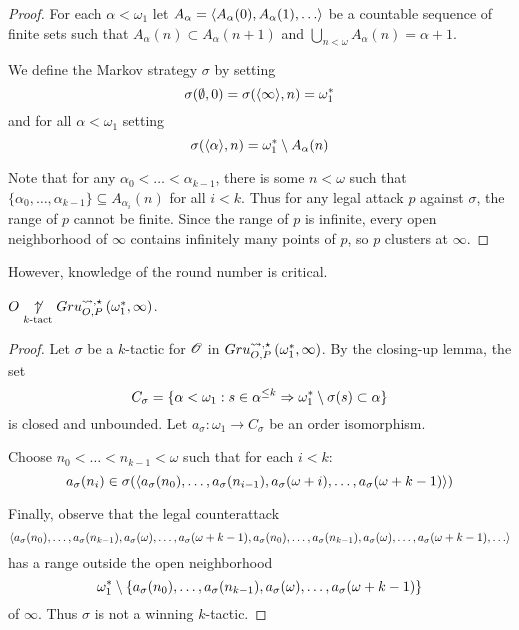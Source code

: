\begin{proof}
  For each $\alpha<\omega_1$ let $A_\alpha=\<A_\alpha(0),A_\alpha(1),\dots\>$
  be a countable sequence of finite sets such that
  $A_\alpha(n)\subset A_\alpha(n+1)$ and
  $\bigcup_{n<\omega}A_\alpha(n)=\alpha+1$.

  We define the Markov strategy $\sigma$ by setting
    \[
      \sigma(\emptyset,0) = \sigma(\langle\infty\rangle,n) = \omega^*_1
    \]
  and for all $\alpha<\omega_1$ setting
    \[
      \sigma(\langle\alpha\rangle,n) = \omega^*_1 \setminus A_\alpha(n)
    \]

  Note that for any $\alpha_0<\dots<\alpha_{k-1}$, there is some $n<\omega$
  such that
  $\{\alpha_0,\dots,\alpha_{k-1}\}\subseteq A_{\alpha_i}(n)$ for all $i<k$.
  Thus for any legal attack $p$ against $\sigma$, the range of $p$ cannot
  be finite. Since the range of $p$ is infinite, every open neighborhood of
  $\infty$ contains infinitely many points of $p$, so $p$ clusters at $\infty$.
\end{proof}

However, knowledge of the round number is critical.

\begin{thm}
  $O\underset{k\text{-tact}}{\not\uparrow}Gru_{O,P}^{\leadsto,\star}\left({\omega^*_1},{\infty}\right)$.
\end{thm}

\begin{proof}
  Let $\sigma$ be a $k$-tactic for $\mathscr{O}$ in
  $Gru_{O,P}^{\leadsto,\star}\left({\omega^*_1},{\infty}\right)$. By the closing-up lemma, the set
    \[
      C_\sigma
        =
      \{
        \alpha<\omega_1
          :
        s\in\alpha^{\leq k}
          \Rightarrow
        \omega^*_1\setminus\sigma(s)
        \subset \alpha
      \}
    \]
  is closed and unbounded. Let $a_\sigma:\omega_1\to C_\sigma$ be an order
  isomorphism.

  Choose $n_0<\dots<n_{k-1}<\omega$ such that for each $i<k$:
    \[
      a_\sigma(n_i)
        \in
      \sigma(
        \langle a_\sigma(n_0),\dots,a_\sigma(n_{i-1}),
          a_\sigma(\omega+i),\dots,a_\sigma(\omega+k-1)\rangle
      )
    \]

  Finally, observe that the legal counterattack
    \[
      \<a_\sigma(n_0),\dots,a_\sigma(n_{k-1}),
        a_\sigma(\omega),\dots,a_\sigma(\omega+k-1),
        a_\sigma(n_0),\dots,a_\sigma(n_{k-1}),
        a_\sigma(\omega),\dots,a_\sigma(\omega+k-1),
        \dots\>
    \]
  has a range outside the open neighborhood %
    \[
      \omega^*_1
        \setminus
      \{a_\sigma(n_0),\dots,a_\sigma(n_{k-1}),
        a_\sigma(\omega),\dots,a_\sigma(\omega+k-1)\}
    \]
  of $\infty$. Thus $\sigma$ is not a winning $k$-tactic.
\end{proof}

